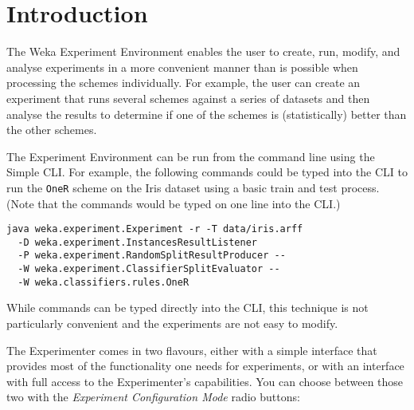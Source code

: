 %
%
%
%



\section{Introduction}

The Weka Experiment Environment enables the user to create, run, modify, and analyse experiments in a more convenient manner than is possible when processing the schemes individually. For example, the user can create an experiment that runs several schemes against a series of datasets and then analyse the results to determine if one of the schemes is (statistically) better than the other schemes.

The Experiment Environment can be run from the command line using the Simple CLI. For example, the following commands could be typed into the CLI to run the \texttt{OneR} scheme on the Iris dataset using a basic train and test process. (Note that the commands would be typed on one line into the CLI.)

\begin{verbatim}
java weka.experiment.Experiment -r -T data/iris.arff
  -D weka.experiment.InstancesResultListener
  -P weka.experiment.RandomSplitResultProducer --
  -W weka.experiment.ClassifierSplitEvaluator --
  -W weka.classifiers.rules.OneR
\end{verbatim}

While commands can be typed directly into the CLI, this technique is not particularly convenient and the experiments are not easy to modify.

The Experimenter comes in two flavours, either with a simple interface that provides most of the functionality one needs for experiments, or with an interface with full access to the Experimenter's capabilities. You can choose between those two with the \textit{Experiment Configuration Mode} radio buttons:

